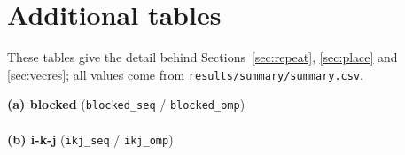 \documentclass[11pt,a4paper]{article}
\begin{document}
\section{Additional tables}\label{app:tables}
These tables give the detail behind Sections~\ref{sec:repeat}, \ref{sec:place} and \ref{sec:vecres}; all values come from \texttt{results/summary/summary.csv}.

\begin{table}[H]
\centering
\caption{Median time per multiplication (relative IQR in \%, small type). Main study,
placement \texttt{spread}, SSE2 build. The sequential column is the baseline $T_\text{seq}$.}
\label{tab:time}
\small
\textbf{(a) blocked} (\texttt{blocked\_seq} / \texttt{blocked\_omp})\\[2pt]
\resizebox{\linewidth}{!}{\BlockedTimeTable}\\[6pt]
\textbf{(b) i-k-j} (\texttt{ikj\_seq} / \texttt{ikj\_omp})\\[2pt]
\resizebox{\linewidth}{!}{\IkjTimeTable}
\end{table}

\begin{table}[H]
\centering
\caption{The same configuration ($n=2048$, SSE2, \texttt{spread}) measured by three
experiments in separate processes: median time (relative IQR in \%).}
\label{tab:repeat}
\small\RepeatTable
\end{table}

\begin{table}[H]
\centering
\caption{Median time at $n=2048$ by placement (relative IQR in \%). Last column: distinct
physical cores used by the threads of the unpinned run, sampled after the measurements.}
\label{tab:affinity}
\small\AffinityTable
\end{table}

\begin{table}[H]
\centering
\caption{Blocked parallel kernel with and without \texttt{omp simd} (median time). ``With''
is taken from the scaling run and, at $n=2048$, also from the vectorisation run. Ratio
$=$ without / scaling run.}
\label{tab:simd}
\small\SimdTable
\end{table}
\end{document}
